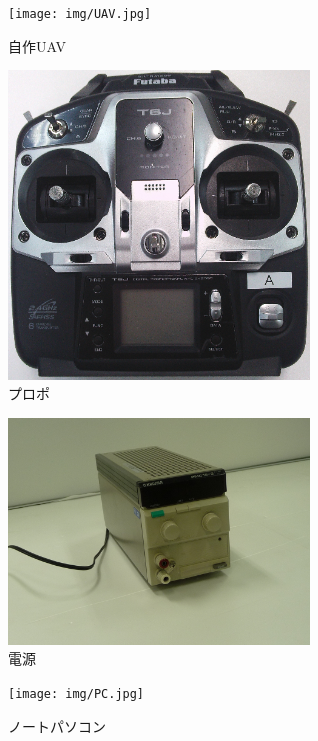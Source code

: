 \documentclass[12pt,oneside]{sotsuken_paper}
\begin{document}
\begin{figure}[H]
\begin{center}
\texttt{[image: img/UAV.jpg]}
\end{center}
\caption{自作UAV}
\label{fig:UAV}
\end{figure}

\begin{figure}[H]
\begin{center}
\includegraphics[width=80mm]{img/puropo.png}
\end{center}
\caption{プロポ}
\label{fig:puropo}
\end{figure}

\begin{figure}[H]
\begin{center}
\includegraphics[width=80mm]{img/dengen.jpg}
\end{center}
\caption{電源}
\label{fig:dengen}
\end{figure}

\begin{figure}[H]
\begin{center}
\texttt{[image: img/PC.jpg]}
\end{center}
\caption{ノートパソコン}
\label{fig:PC}
\end{figure}
\end{document}
